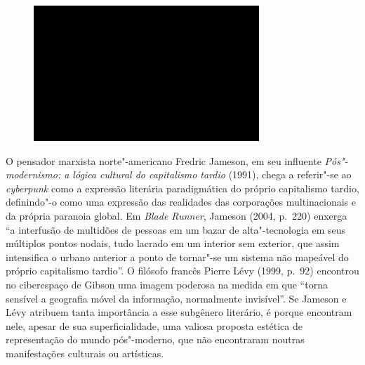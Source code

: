 \begin{figure}[!ht]

\centering
 \includegraphics[width=85mm]{./imgs/im1.jpg}
\caption{\tiny{}}

\end{figure}

O pensador marxista norte"-americano Fredric Jameson, em seu influente
\emph{Pós"-modernismo: a lógica cultural do capitalismo tardio} (1991),
chega a referir"-se ao \emph{cyberpunk} como a expressão literária
paradigmática do próprio capitalismo tardio, definindo"-o como uma
expressão das realidades das corporações multinacionais e da própria
paranoia global. Em \emph{Blade Runner}, Jameson (2004, p.~220) enxerga
``a interfusão de multidões de pessoas em um bazar de alta"-tecnologia em
seus múltiplos pontos nodais, tudo lacrado em um interior sem exterior,
que assim intensifica o urbano anterior a ponto de tornar"-se um sistema
não mapeável do próprio capitalismo tardio''. O filósofo francês Pierre
Lévy (1999, p.~92) encontrou no ciberespaço de Gibson uma imagem
poderosa na medida em que ``torna sensível a geografia móvel da
informação, normalmente invisível''. Se Jameson e Lévy atribuem tanta
importância a esse subgênero literário, é porque encontram nele, apesar
de sua superficialidade, uma valiosa proposta estética de representação
do mundo pós"-moderno, que não encontraram noutras manifestações
culturais ou artísticas.

